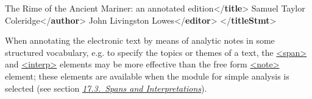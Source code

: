 \begin{shaded}
The Rime of the Ancient Mariner: an annotated edition{</\textbf{title}>}\mbox{}\newline 
{}Samuel Taylor Coleridge{</\textbf{author}>}\mbox{}\newline 
{}John Livingston Lowes{</\textbf{editor}>}\mbox{}\newline 
{</\textbf{titleStmt}>}\end{shaded}\egroup\par \par
When annotating the electronic text by means of analytic notes in some structured vocabulary, e.g. to specify the topics or themes of a text, the \hyperref[TEI.span]{<span>} and \hyperref[TEI.interp]{<interp>} elements may be more effective than the free form \hyperref[TEI.note]{<note>} element; these elements are available when the module for simple analysis is selected (see section \textit{\hyperref[AISP]{17.3.\ Spans and Interpretations}}).
